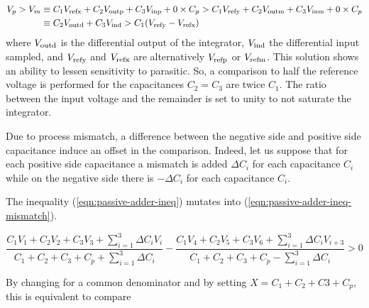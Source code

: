 \begin{align}
	\label{eqn:passive-adder-ineq}
	V_p > V_m &\equiv C_1V_{\rm refx}+C_2V_{\rm outp}+C_3V_{\rm inp}+0\times C_p > C_1V_{\rm refy}+C_2V_{\rm outm}+C_3V_{\rm inm}+0\times C_p \\
	&\equiv C_2V_{\rm outd}+C_3V_{\rm ind} > C_1(V_{\rm refy}-V_{\rm refx})
\end{align}
where  \(V_{\rm outd}\) is the differential output of the integrator, \(V_{\rm ind}\) the differential input sampled, and \(V_{\rm refy}\) and \(V_{\rm refx}\) are alternatively \(V_{\rm refp}\) or \(V_{\rm refm}\). This solution shows an ability to lessen sensitivity to parasitic. So, a comparison to half the reference voltage is performed for the capacitances \(C_2 = C_3\) are twice \(C_1\). The ratio between the input voltage and the remainder is set to unity to not saturate the integrator.

Due to process mismatch, a difference between the negative side and positive side capacitance induce an offset in the comparison. Indeed, let us suppose that for each positive side capacitance a mismatch is added \(\Delta C_i\) for each capacitance \(C_i\) while on the negative side there is \(-\Delta C_i\) for each capacitance \(C_i\). 

The inequality (\ref{eqn:passive-adder-ineq}) mutates into (\ref{eqn:passive-adder-ineq-mismatch}).

\begin{equation}
	\label{eqn:passive-adder-ineq-mismatch}
	\frac{C_1V_{1}+C_2V_{2}+C_3V_{3}+\sum_{i=1}^{3}{\Delta C_i V_i}}{C_1+C_2+C_3+C_p+\sum_{i=1}^{3}{\Delta C_i}} - \frac{C_1V_{4}+C_2V_{5}+C_3V_{6}+\sum_{i=1}^{3}{\Delta C_i V_{i+3}}}{C_1+C_2+C_3+C_p-\sum_{i=1}^{3}{\Delta C_i}} > 0
\end{equation}

By changing for a common denominator and by setting \(X = C_1 + C_2 + C3 + C_p\), this is equivalent to compare 

